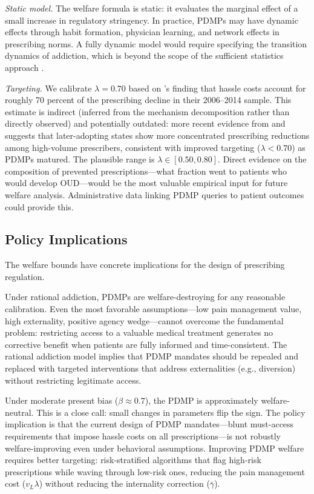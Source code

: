 \documentclass[12pt]{article}
\begin{document}
\textit{Static model.} The welfare formula is static: it evaluates the marginal effect of a small increase in regulatory stringency. In practice, PDMPs may have dynamic effects through habit formation, physician learning, and network effects in prescribing norms. A fully dynamic model would require specifying the transition dynamics of addiction, which is beyond the scope of the sufficient statistics approach \citep{deaton2018understanding}.

\textit{Targeting.} We calibrate $\lambda = 0.70$ based on \citet{buchmueller2018effect}'s finding that hassle costs account for roughly 70 percent of the prescribing decline in their 2006--2014 sample. This estimate is indirect (inferred from the mechanism decomposition rather than directly observed) and potentially outdated: more recent evidence from \citet{dave2021mandatory} and \citet{horwitz2021effect} suggests that later-adopting states show more concentrated prescribing reductions among high-volume prescribers, consistent with improved targeting ($\lambda < 0.70$) as PDMPs matured. The plausible range is $\lambda \in [0.50, 0.80]$. Direct evidence on the composition of prevented prescriptions---what fraction went to patients who would develop OUD---would be the most valuable empirical input for future welfare analysis. Administrative data linking PDMP queries to patient outcomes could provide this.

\subsection{Policy Implications}\label{sec:discussion_policy}

The welfare bounds have concrete implications for the design of prescribing regulation.

Under rational addiction, PDMPs are welfare-destroying for any reasonable calibration. Even the most favorable assumptions---low pain management value, high externality, positive agency wedge---cannot overcome the fundamental problem: restricting access to a valuable medical treatment generates no corrective benefit when patients are fully informed and time-consistent. The rational addiction model implies that PDMP mandates should be repealed and replaced with targeted interventions that address externalities (e.g., diversion) without restricting legitimate access.

Under moderate present bias ($\beta \approx 0.7$), the PDMP is approximately welfare-neutral. This is a close call: small changes in parameters flip the sign. The policy implication is that the current design of PDMP mandates---blunt must-access requirements that impose hassle costs on all prescriptions---is not robustly welfare-improving even under behavioral assumptions. Improving PDMP welfare requires better targeting: risk-stratified algorithms that flag high-risk prescriptions while waving through low-risk ones, reducing the pain management cost ($v_L \lambda$) without reducing the internality correction ($\bar{\gamma}$).
\end{document}
